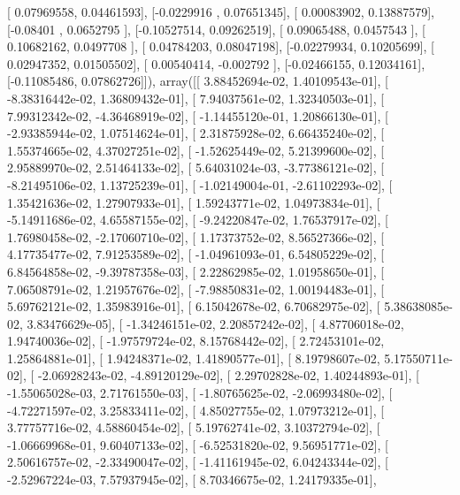 \documentclass{article}
\begin{document}
       [ 0.07969558,  0.04461593],
       [-0.0229916 ,  0.07651345],
       [ 0.00083902,  0.13887579],
       [-0.08401   ,  0.0652795 ],
       [-0.10527514,  0.09262519],
       [ 0.09065488,  0.0457543 ],
       [ 0.10682162,  0.0497708 ],
       [ 0.04784203,  0.08047198],
       [-0.02279934,  0.10205699],
       [ 0.02947352,  0.01505502],
       [ 0.00540414, -0.002792  ],
       [-0.02466155,  0.12034161],
       [-0.11085486,  0.07862726]]), array([[  3.88452694e-02,   1.40109543e-01],
       [ -8.38316442e-02,   1.36809432e-01],
       [  7.94037561e-02,   1.32340503e-01],
       [  7.99312342e-02,  -4.36468919e-02],
       [ -1.14455120e-01,   1.20866130e-01],
       [ -2.93385944e-02,   1.07514624e-01],
       [  2.31875928e-02,   6.66435240e-02],
       [  1.55374665e-02,   4.37027251e-02],
       [ -1.52625449e-02,   5.21399600e-02],
       [  2.95889970e-02,   2.51464133e-02],
       [  5.64031024e-03,  -3.77386121e-02],
       [ -8.21495106e-02,   1.13725239e-01],
       [ -1.02149004e-01,  -2.61102293e-02],
       [  1.35421636e-02,   1.27907933e-01],
       [  1.59243771e-02,   1.04973834e-01],
       [ -5.14911686e-02,   4.65587155e-02],
       [ -9.24220847e-02,   1.76537917e-02],
       [  1.76980458e-02,  -2.17060710e-02],
       [  1.17373752e-02,   8.56527366e-02],
       [  4.17735477e-02,   7.91253589e-02],
       [ -1.04961093e-01,   6.54805229e-02],
       [  6.84564858e-02,  -9.39787358e-03],
       [  2.22862985e-02,   1.01958650e-01],
       [  7.06508791e-02,   1.21957676e-02],
       [ -7.98850831e-02,   1.00194483e-01],
       [  5.69762121e-02,   1.35983916e-01],
       [  6.15042678e-02,   6.70682975e-02],
       [  5.38638085e-02,   3.83476629e-05],
       [ -1.34246151e-02,   2.20857242e-02],
       [  4.87706018e-02,   1.94740036e-02],
       [ -1.97579724e-02,   8.15768442e-02],
       [  2.72453101e-02,   1.25864881e-01],
       [  1.94248371e-02,   1.41890577e-01],
       [  8.19798607e-02,   5.17550711e-02],
       [ -2.06928243e-02,  -4.89120129e-02],
       [  2.29702828e-02,   1.40244893e-01],
       [ -1.55065028e-03,   2.71761550e-03],
       [ -1.80765625e-02,  -2.06993480e-02],
       [ -4.72271597e-02,   3.25833411e-02],
       [  4.85027755e-02,   1.07973212e-01],
       [  3.77757716e-02,   4.58860454e-02],
       [  5.19762741e-02,   3.10372794e-02],
       [ -1.06669968e-01,   9.60407133e-02],
       [ -6.52531820e-02,   9.56951771e-02],
       [  2.50616757e-02,  -2.33490047e-02],
       [ -1.41161945e-02,   6.04243344e-02],
       [ -2.52967224e-03,   7.57937945e-02],
       [  8.70346675e-02,   1.24179335e-01],
\end{document}
